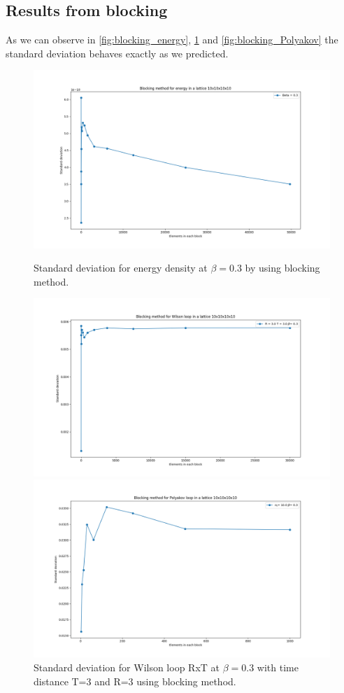         \subsection{Results from blocking}
            \noindent
            As we can observe in \cref{fig:blocking_energy}, \cref{fig:blocking_Wilson} and \ref{fig:blocking_Polyakov} the standard deviation behaves exactly as we predicted.
            \noindent
            \begin{figure}[H]
                \centering
                \includegraphics[scale= 0.25]{Blocking_energy.png}
                \caption{Standard deviation for energy density at $\beta=0.3$ by using blocking method.}
                \label{fig:blocking_energy} 
                \includegraphics[scale= 0.25]{blockingWilson.png} 
                \caption{Standard deviation for Wilson loop RxT at $\beta=0.3$ with time distance T=3 and R=3 using blocking method.}
                \label{fig:blocking_Wilson} 
                \includegraphics[scale= 0.25]{BlockingPolyakov.png} 

\end{figure}
